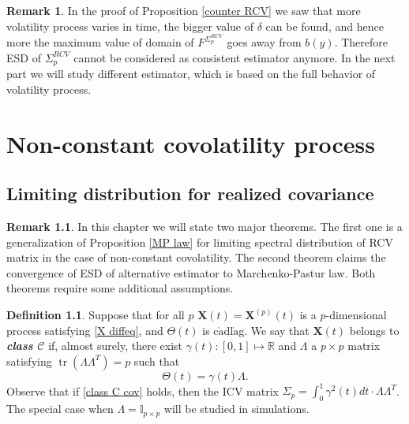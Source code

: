 \documentclass[a4paper,11pt]{book}
\theoremstyle{plain}
\theoremstyle{definition}
\newtheorem{defn}[thm]{Definition}
\newtheorem{rmrk}[thm]{Remark}
\newcommand{\MR}{\mathbb{R}}
\newcommand{\tr}{\operatorname{tr}}
\newcommand{\define}[1]{\textit{\textbf{#1}}}
\begin{document}
    \begin{rmrk}
    	In the proof of Proposition \ref{counter RCV} we saw that more volatility process varies in time, the bigger value of $\delta$ can be found, and hence more the maximum value of domain of $F^{\Sigma_p^{RCV}}$ goes away from $b(y)$. Therefore ESD of $\Sigma_p^{RCV}$ cannot be considered as consistent estimator anymore. In the next part we will study different estimator, which is based on the full behavior of volatility process.
    \end{rmrk}
    
    \chapter{Non-constant covolatility process}
    
    \section{Limiting distribution for realized covariance}
    \begin{rmrk}
    	In this chapter we will state two major theorems. The first one is a generalization of Proposition \ref{MP law} for limiting spectral distribution of RCV matrix in the case of non-constant covolatility. The second theorem claims the convergence of ESD of alternative estimator to Marchenko-Pastur law. Both theorems require some additional assumptions.
    \end{rmrk}
    
    
    \begin{defn}
    	Suppose that for all $p$ $\mathbf{X}(t) = \mathbf{X}^{(p)}(t)$ is a $p$-dimensional process satisfying \eqref{X diffeq}, and $\Theta(t)$ is c$\grave{\text{a}}$dl$\grave{\text{a}}$g. We say that $\mathbf{X}(t)$ belongs to \define{class $\mathcal{C}$} if, almost surely, there exist $\gamma(t): [0, 1] \mapsto \MR$ and $\Lambda$ a $p \times p$ matrix satisfying $\tr(\Lambda \Lambda^T) = p$ such that 
    	\begin{equation} \label{class C cov}
    	\Theta(t) = \gamma(t) \Lambda.
    	\end{equation}
    	Observe that if \eqref{class C cov} holds, then the ICV matrix $\Sigma_p = \int_{0}^{1} \gamma^2(t) dt \cdot \Lambda \Lambda^T$. The special case when $\Lambda = \mathbb{I}_{p \times p}$ will be studied in simulations.
    \end{defn}
    
\end{document}
